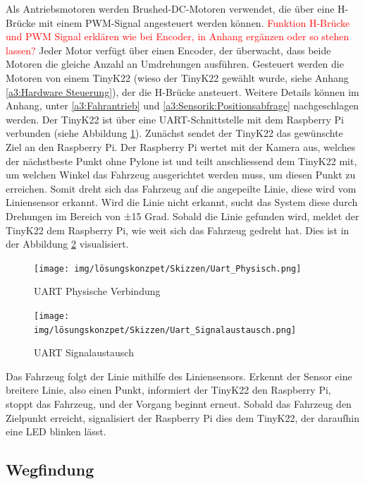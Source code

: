 \documentclass[../main.tex]{subfiles}
\begin{document}
Als Antriebsmotoren werden Brushed-DC-Motoren verwendet, die über eine H-Brücke mit einem PWM-Signal angesteuert werden können. \textcolor{red}{Funktion H-Brücke und PWM Signal erklären wie bei Encoder, in Anhang ergänzen oder so stehen lassen?} Jeder Motor verfügt über einen Encoder, der überwacht, dass beide Motoren die gleiche Anzahl an Umdrehungen ausführen. Gesteuert werden die Motoren von einem TinyK22 (wieso der TinyK22 gewählt wurde, siehe Anhang \ref{a3:Hardware Steuerung}), der die H-Brücke ansteuert. Weitere Details können im Anhang, unter \ref{a3:Fahrantrieb} und \ref{a3:Sensorik:Positionsabfrage} nachgeschlagen werden.
\newpage
Der TinyK22 ist über eine UART-Schnittstelle mit dem Raspberry Pi verbunden (siehe Abbildung \ref{img:UART_Physisch}). Zunächst sendet der TinyK22 das gewünschte Ziel an den Raspberry Pi. Der Raspberry Pi wertet mit der Kamera aus, welches der nächstbeste Punkt ohne Pylone ist und teilt anschliessend dem TinyK22 mit, um welchen Winkel das Fahrzeug ausgerichtet werden muss, um diesen Punkt zu erreichen. Somit dreht sich das Fahrzeug auf die angepeilte Linie, diese wird vom Liniensensor erkannt. Wird die Linie nicht erkannt, sucht das System diese durch Drehungen im Bereich von ±15 Grad. Sobald die Linie gefunden wird, meldet der TinyK22 dem Raspberry Pi, wie weit sich das Fahrzeug gedreht hat. Dies ist in der Abbildung \ref{img:UART_Signalaustausch} visualisiert.

\begin{figure}[H]
\centering
\texttt{[image: img/lösungskonzpet/Skizzen/Uart\_Physisch.png]}
\caption{UART Physische Verbindung}
\label{img:UART_Physisch}
\end{figure}

\begin{figure}[H]
\centering
\texttt{[image: img/lösungskonzpet/Skizzen/Uart\_Signalaustausch.png]}
\caption{UART Signalaustausch}
\label{img:UART_Signalaustausch}
\end{figure}


Das Fahrzeug folgt der Linie mithilfe des Liniensensors. Erkennt der Sensor eine breitere Linie, also einen Punkt, informiert der TinyK22 den Raspberry Pi, stoppt das Fahrzeug, und der Vorgang beginnt erneut. Sobald das Fahrzeug den Zielpunkt erreicht, signalisiert der Raspberry Pi dies dem TinyK22, der daraufhin eine LED blinken lässt.

\newpage

\subsection{Wegfindung}
\end{document}
